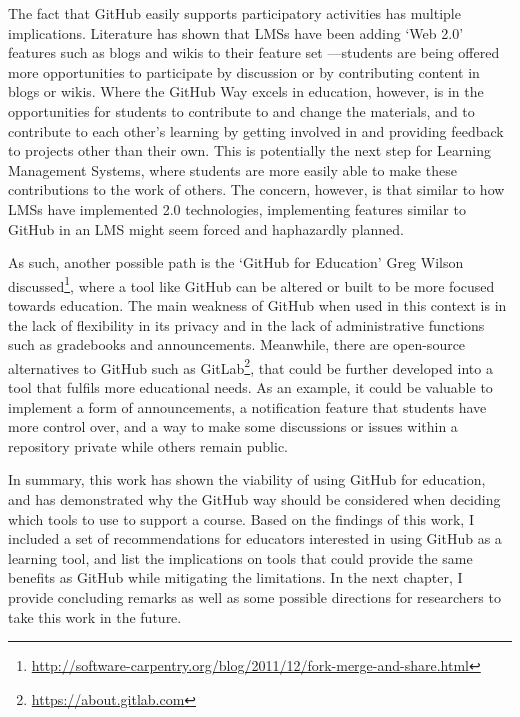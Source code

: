 The fact that GitHub easily supports participatory activities has multiple implications. Literature has shown that LMSs have been adding `Web 2.0' features such as blogs and wikis to their feature set \cite{downes2005feature}---students are being offered more opportunities to participate by discussion or by contributing content in blogs or wikis. Where the GitHub Way excels in education, however, is in the opportunities for students to contribute to and change the materials, and to contribute to each other's learning by getting involved in and providing feedback to projects other than their own. This is potentially the next step for Learning Management Systems, where students are more easily able to make these contributions to the work of others. The concern, however, is that similar to how LMSs have implemented 2.0 technologies, implementing features similar to GitHub in an LMS might seem forced and haphazardly planned.

As such, another possible path is the `GitHub for Education' Greg Wilson discussed\footnote{\url{http://software-carpentry.org/blog/2011/12/fork-merge-and-share.html}}, where a tool like GitHub can be altered or built to be more focused towards education. The main weakness of GitHub when used in this context is in the lack of flexibility in its privacy and in the lack of administrative functions such as gradebooks and announcements. Meanwhile, there are open-source alternatives to GitHub such as GitLab\footnote{\url{https://about.gitlab.com}}, that could be further developed into a tool that fulfils more educational needs. As an example, it could be valuable to implement a form of announcements, a notification feature that students have more control over, and a way to make some discussions or issues within a repository private while others remain public.

In summary, this work has shown the viability of using GitHub for education, and has demonstrated why the GitHub way should be considered when deciding which tools to use to support a course. Based on the findings of this work, I included a set of recommendations for educators interested in using GitHub as a learning tool, and list the implications on tools that could provide the same benefits as GitHub while mitigating the limitations. In the next chapter, I provide concluding remarks as well as some possible directions for researchers to take this work in the future.


